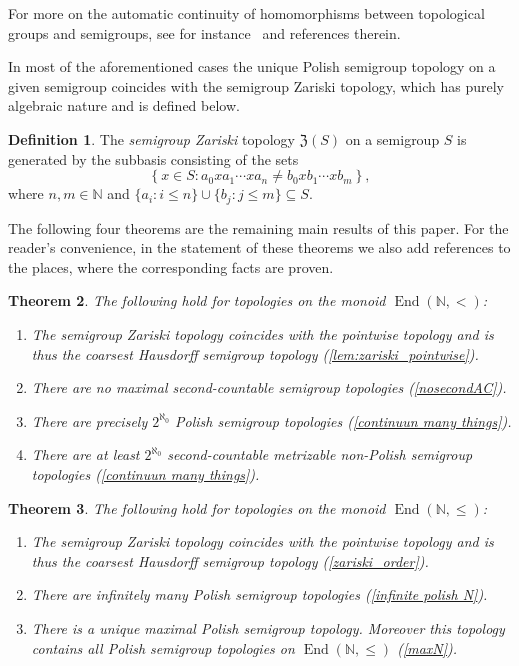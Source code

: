 \documentclass[11pt]{amsart}
\newtheorem{theorem}{Theorem}[section]
\theoremstyle{definition}
\newtheorem{definition}[theorem]{Definition}
\newcommand{\N}{\mathbb N}
\newcommand{\End}{\operatorname{End}(\mathbb N, <)}
\newcommand{\Endd}{\operatorname{End}(\mathbb N, \leq)}
\newcommand{\set}[2]{\left\{#1:#2\right\}}
\begin{document}
For more on the automatic continuity of homomorphisms between topological groups and semigroups, see for instance~\cite{Banakh, main, EJMPP, Kuzne, pech2016automatic, Rosen1, Rosen2, Rosen3, Rosen4survey, Tsankov} and references therein.

In most of the aforementioned cases the unique Polish semigroup topology on a given semigroup coincides with the semigroup Zariski topology, which has purely algebraic nature and is defined below. 
 
\begin{definition}
The {\em semigroup Zariski} topology $\mathfrak{Z}(S)$
on a semigroup $S$ is generated by the subbasis consisting
of the sets $$\set{x\in S}{a_0xa_1\cdots xa_n \neq b_0xb_1\cdots xb_m},$$ where $n,m\in\N$ and $\{a_i: i\leq n\}\cup\{b_j: j\leq m\}\subseteq S$. 
\end{definition}

The following four theorems are the remaining main results of this paper. For the reader's convenience, in the statement of these theorems we also add references to the places, where the corresponding facts are proven.

\begin{theorem}\label{thm:endNl}
The following hold for topologies on the monoid \(\End\):
\begin{enumerate}[\rm(1)]
    \item The semigroup Zariski topology coincides with the pointwise topology and is thus the coarsest Hausdorff semigroup topology (\cref{lem:zariski_pointwise}).
    \item There are no maximal second-countable semigroup topologies (\cref{nosecondAC}).
    \item There are precisely \(2^{\aleph_0}\) Polish semigroup topologies (\cref{continuun many things}).
    \item There are at least \(2^{\aleph_0}\) second-countable metrizable non-Polish semigroup topologies (\cref{continuun many things}).
\end{enumerate}
\end{theorem}

\begin{theorem}\label{thm:endN}
The following hold for topologies on the monoid \(\Endd\):
\begin{enumerate}[\rm(1)]
    \item The semigroup Zariski topology coincides with the pointwise topology and is thus the coarsest Hausdorff semigroup topology (\cref{zariski_order}).
    \item There are infinitely many Polish semigroup topologies (\cref{infinite polish N}).
    \item There is a unique maximal Polish semigroup topology. Moreover this topology contains all Polish semigroup topologies on \(\Endd\)  (\cref{maxN}).
\end{enumerate}
\end{theorem}
\end{document}
